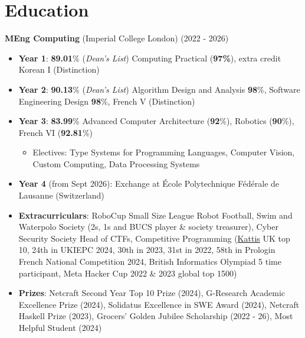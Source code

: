 \documentclass{Resume}
\begin{document}
\vspace{-2em}
\section{Education}
\textbf{MEng Computing} (Imperial College London) \hfill (2022 - 2026)

 {\small
 \begin{itemize}[label=--]
      \item \textbf{Year 1}: \textbf{89.01}\% (\textit{Dean's List}) Computing Practical (\textbf{97\%}), extra credit Korean I (Distinction)
     \item \textbf{Year 2}: \textbf{90.13}\% (\textit{Dean's List}) Algorithm Design and Analysis \textbf{98}\%, Software Engineering Design \textbf{98}\%, French V (Distinction)
    \item \textbf{Year 3}: \textbf{83.99}\% Advanced Computer Architecture (\textbf{92}\%), Robotics (\textbf{90}\%), French VI (\textbf{92.81}\%) \begin{itemize}
        \item Electives: Type Systems for Programming Languages, Computer Vision, Custom Computing, Data Processing Systems
    \end{itemize}
     \item \textbf{Year 4} (from Sept 2026): Exchange at École Polytechnique Fédérale de Lausanne (Switzerland)
    \item \textbf{Extracurriculars}: RoboCup Small Size League Robot Football, Swim and Waterpolo Society (2s, 1s and BUCS player \& society treasurer), Cyber Security Society Head of CTFs, Competitive Programming (\href{https://open.kattis.com/countries/GBR}{Kattis} UK top 10, 24th in UKIEPC 2024, 30th in 2023, 31st in 2022, 58th in Prologin French National Competition 2024, British Informatics Olympiad 5 time participant, Meta Hacker Cup 2022 \& 2023 global top 1500)
    \item \textbf{Prizes}: Netcraft Second Year Top 10 Prize (2024), G-Research Academic Excellence Prize (2024), Solidatus Excellence in SWE Award (2024), Netcraft Haskell Prize (2023), Grocers' Golden Jubilee Scholarship (2022 - 26), Most Helpful Student (2024)
    

\end{itemize}}
\end{document}
